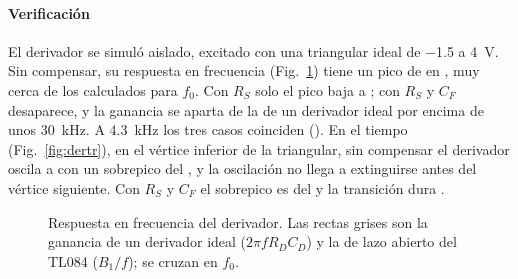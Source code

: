 \paragraph*{Verificación} El derivador se simuló aislado, excitado con una triangular ideal de \SI{-1,5}{} a \SI{4}{\volt}. Sin compensar, su respuesta en frecuencia (Fig.~\ref{fig:derac}) tiene un pico de  en , muy cerca de los  calculados para $f_0$. Con $R_S$ solo el pico baja a ; con $R_S$ y $C_F$ desaparece, y la ganancia se aparta de la de un derivador ideal por encima de unos \SI{30}{\kilo\hertz}. A \SI{4,3}{\kilo\hertz} los tres casos coinciden (). En el tiempo (Fig.~\ref{fig:dertr}), en el vértice inferior de la triangular, sin compensar el derivador oscila a  con un sobrepico del , y la oscilación no llega a extinguirse antes del vértice siguiente. Con $R_S$ y $C_F$ el sobrepico es del  y la transición dura .

\begin{figure}[!htb]
\centering
{}
\caption{Respuesta en frecuencia del derivador. Las rectas grises son la ganancia de un derivador ideal ($2\pi f R_D C_D$) y la de lazo abierto del TL084 ($B_1/f$); se cruzan en $f_0$.}
\label{fig:derac}
\end{figure}

